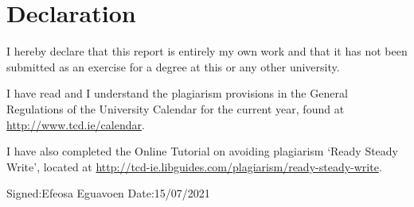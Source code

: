 \documentclass[a4paper,oneside,12pt]{book}
\title{\thesistitle}
\author{\authorname}
\begin{document}

\section*{\Huge{Declaration}}
\vspace{1cm}
I hereby declare that this report is entirely my own work and that it has not been submitted as an exercise for a degree at this or any other university.

\vspace{1cm}
I have read and I understand the plagiarism provisions in the General Regulations of the University Calendar for the current year, found at \url{http://www.tcd.ie/calendar}.
\vspace{1cm}

I have also completed the Online Tutorial on avoiding plagiarism `Ready Steady Write', located at
\url{http://tcd-ie.libguides.com/plagiarism/ready-steady-write}.
\vspace{3cm}

Signed:Efeosa Eguavoen \hspace{2cm}  Date:15/07/2021

\newpage

\onehalfspacing\raggedright %

\tableofcontents
\newpage
\doublespacing

\mainmatter






 

\end{document}
